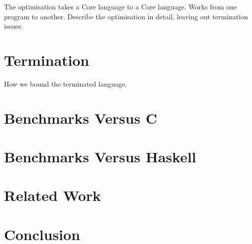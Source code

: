 \documentclass{llncs}
\begin{document}
The optimisation takes a Core language to a Core language. Works from one program to another. Describe the optimisation in detail, leaving out termination issues.

\section{Termination}

How we bound the terminated language.

\section{Benchmarks Versus C}


\section{Benchmarks Versus Haskell}

\section{Related Work}

\section{Conclusion}
\end{document}
